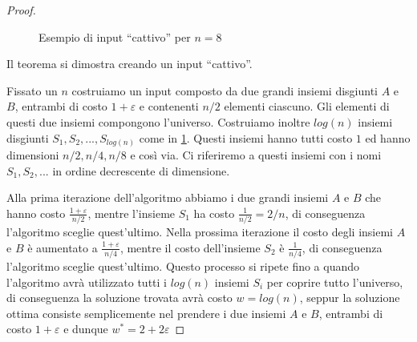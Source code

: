 \begin{proof}
\begin{figure}[h]
		\caption{Esempio di input ``cattivo'' per $n=8$}
		\label{fig:setcover_tightness}
	\end{figure}
	
	Il teorema si dimostra creando un input ``cattivo''.

	Fissato un $n$ costruiamo un input composto da due grandi insiemi disgiunti
	$A$ e $B$, entrambi di costo $1 + \varepsilon$ e contenenti $n / 2$
	elementi ciascuno. Gli elementi di questi due insiemi compongono
	l'universo. Costruiamo inoltre $log(n)$ insiemi disgiunti
	$S_1, S_2, ..., S_{log(n)}$ come in \cref{fig:setcover_tightness}.
	Questi insiemi hanno tutti costo $1$ ed hanno dimensioni $n/2, n/4, n/8$
	e così via. Ci riferiremo a questi insiemi con i nomi $S_1, S_2, ...$ in
	ordine decrescente di dimensione.

	Alla prima iterazione dell'algoritmo abbiamo i due grandi insiemi $A$ e $B$
	che hanno costo $\frac{1 + \varepsilon}{n / 2}$, mentre l'insieme $S_1$ ha
	costo $\frac{1}{n / 2}=2/n$, di conseguenza l'algoritmo sceglie
	quest'ultimo. Nella prossima iterazione il costo degli insiemi $A$ e $B$ è
	aumentato a $\frac{1 + \varepsilon}{n / 4}$, mentre il costo dell'insieme
	$S_2$ è $\frac{1}{n / 4}$, di conseguenza l'algoritmo sceglie quest'ultimo.
	Questo processo si ripete fino a quando l'algoritmo avrà utilizzato tutti i
	$log(n)$ insiemi $S_i$ per coprire tutto l'universo, di conseguenza la
	soluzione trovata avrà costo $w=log(n)$, seppur la soluzione ottima
	consiste semplicemente nel prendere i due insiemi $A$ e $B$,
	entrambi di costo $1 + \varepsilon$ e dunque $w^*=2 + 2\varepsilon$
\end{proof}

